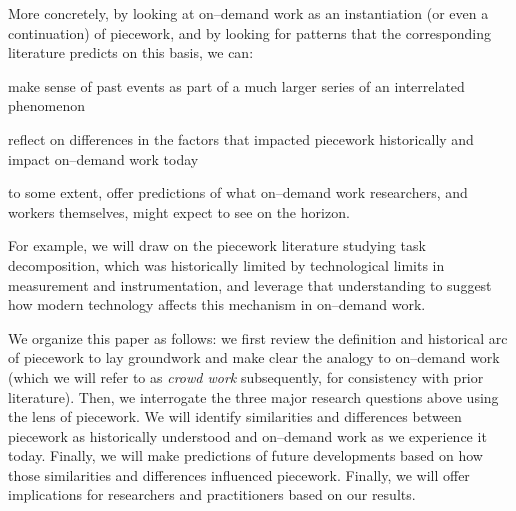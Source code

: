 \documentclass[trackingWork]{subfiles}
\begin{document}
More concretely, by looking at on--demand work as
an instantiation (or even a continuation) of piecework,
and by looking for patterns that the corresponding literature predicts
on this basis, we can:
\begin{numberlist}[itemjoin*={;~and~},itemjoin={;~}]
  \item make sense of past events as part of a much larger series of an interrelated phenomenon
  \item reflect on differences in the factors that impacted piecework historically and impact on--demand work today
  \item to some extent, offer predictions of what on--demand work researchers,
        and workers themselves,
        might expect to see on the horizon.
\end{numberlist}
For example, we will draw on the piecework literature studying task decomposition,
which was historically limited by technological limits in measurement and instrumentation, and
leverage that understanding to suggest how modern technology affects this mechanism in on--demand work.


We organize this paper as follows: we first review the definition and historical arc of piecework to lay  groundwork and make clear the analogy to on--demand work (which we will refer to as \textit{crowd work} subsequently, for consistency with prior literature). Then, we interrogate the three major research questions above using the lens of piecework. 
We will identify similarities and differences between piecework as historically understood and
on--demand work as we experience it today.
Finally, we will make predictions of future developments based on how those similarities and differences influenced piecework.
Finally, we will offer implications for researchers and practitioners based on our results.


\onlyinsubfile{
  \balance{}
  \printbibliography
}
\end{document}
